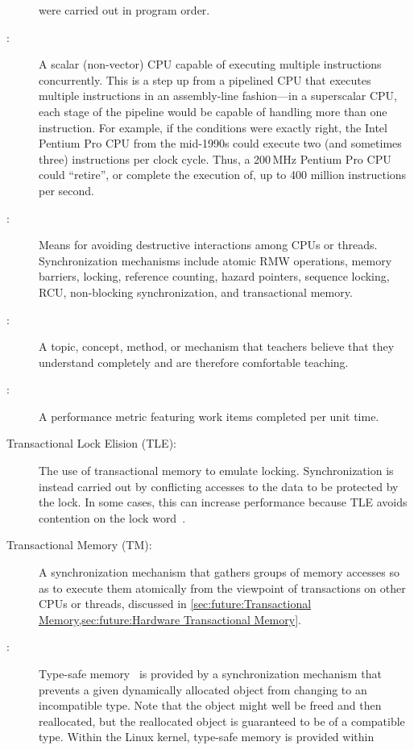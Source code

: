 \begin{description}
	were carried out in program order.
\item[\IXGr{Superscalar CPU}:]
	A scalar (non-vector) CPU capable of executing multiple instructions
	concurrently.
	This is a step up from a pipelined CPU that executes multiple
	instructions in an assembly-line fashion---in a superscalar
	CPU, each stage of the pipeline would be capable of handling
	more than one instruction.
	For example, if the conditions were exactly right,
	the Intel Pentium Pro CPU from the mid-1990s could
	execute two (and sometimes three) instructions per clock cycle.
	Thus, a 200\,MHz Pentium Pro CPU could ``retire'', or complete the
	execution of, up to 400 million instructions per second.
\item[\IXG{Synchronization}:]
	Means for avoiding destructive interactions among CPUs or threads.
	Synchronization mechanisms include atomic RMW operations, memory
	barriers, locking, reference counting, hazard pointers, sequence
	locking, RCU, non-blocking synchronization, and transactional
	memory.
\item[\IXG{Teachable}:]
	A topic, concept, method, or mechanism that teachers believe that
	they understand completely and are therefore comfortable teaching.
\item[\IXG{Throughput}:]
	A performance metric featuring work items completed per unit time.
\item[Transactional Lock Elision (TLE):]
	The use of transactional memory to emulate locking.
	Synchronization is instead carried out by conflicting accesses
	to the data to be protected by the lock.
	In some cases, this can increase performance because TLE
	avoids contention on the lock
	word~\cite{MartinPohlack2011HTM2TLE,Kleen:2014:SEL:2566590.2576793,PascalFelber2016rwlockElision,SeongJaePark2020HTMRCUlock}.
\item[Transactional Memory (TM):]
	A synchronization mechanism that gathers groups of memory
	accesses so as to execute them atomically from the viewpoint
	of transactions on other CPUs or threads, discussed in
	\cref{sec:future:Transactional Memory,sec:future:Hardware Transactional Memory}.
\item[\IXG{Type-Safe Memory}:]
	Type-safe memory~\cite{Cheriton96a} is provided by a
	synchronization mechanism that prevents a given dynamically
	allocated object from changing to an incompatible type.
	Note that the object might well be freed and then reallocated, but
	the reallocated object is guaranteed to be of a compatible type.
	Within the Linux kernel, type-safe memory is provided within

\end{description}
